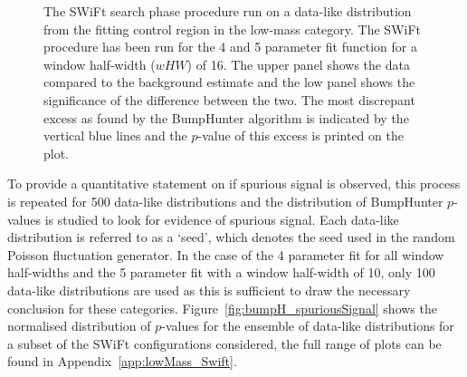 \begin{figure}[!htb]
\vspace{10pt}
\caption{\label{fig:bhFit_lm_corrFitCR_dataLike}
  The SWiFt search phase procedure run on a data-like distribution
  from the fitting control region in the low-mass category.
  The SWiFt procedure has been run for the 4 and 5 parameter fit function for a window half-width ($wHW$) of 16.
  The upper panel shows the data compared to the background estimate and the low panel shows the significance of the difference between the two.
  The most discrepant excess as found by the {\sc BumpHunter} algorithm is indicated by the vertical blue lines and the \mbox{$p$-value} of this excess is printed on the plot. 
}
\end{figure}

To provide a quantitative statement on if spurious signal is observed,
this process is repeated for 500 data-like distributions and the distribution of {\sc BumpHunter} \mbox{$p$-value}s is studied to look for evidence of spurious signal.
Each data-like distribution is referred to as a `seed', which denotes the seed used in the random Poisson fluctuation generator.
In the case of the 4 parameter fit for all window half-widths and the 5 parameter fit with a window half-width of 10,
only 100 data-like distributions are used as this is sufficient to draw the necessary conclusion for these categories.
Figure~\ref{fig:bumpH_spuriousSignal} shows the normalised distribution of \mbox{$p$-value}s for the ensemble of data-like distributions
for a subset of the SWiFt configurations considered, the full range of plots can be found in Appendix~\ref{app:lowMass_Swift}.

